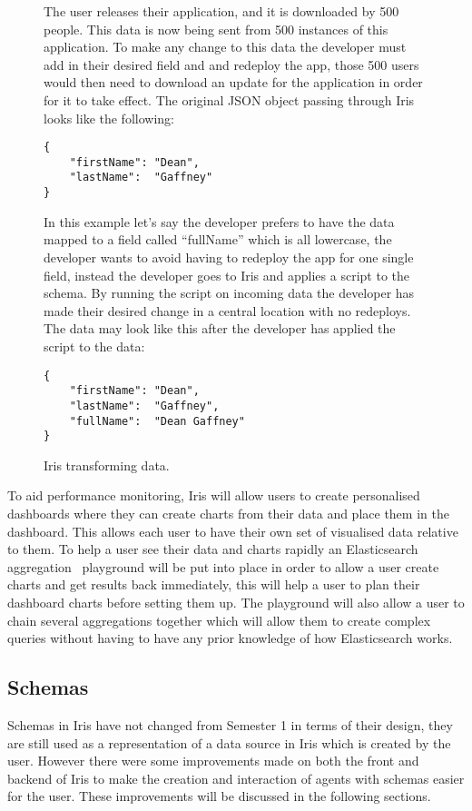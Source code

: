 \documentclass[12pt,a4paper,titlepage]{report}
\newcommand{\q}[1]{``#1''}
\begin{document}
\begin{figure}[H]
\begin{tcolorbox}

The user releases their application, and it is downloaded by 500 people. This data is now being sent from 500 instances of this application. To make any change to this data the developer must add in their desired field and and redeploy the app, those 500 users would then need to download an update for the application in order for it to take effect. The original JSON object passing through Iris looks like the following:
\begin{verbatim}
{
	"firstName": "Dean",
	"lastName":  "Gaffney"
}
\end{verbatim}

In this example let's say the developer prefers to have the data mapped to a field called \q{fullName} which is all lowercase, the developer wants to avoid having to redeploy the app for one single field, instead the developer goes to Iris and applies a script to the schema. By running the script on incoming data the developer has made their desired change in a central location with no redeploys. The data may look like this after the developer has applied the script to the data:
\begin{verbatim}
{
	"firstName": "Dean",
	"lastName":  "Gaffney",
	"fullName":  "Dean Gaffney"
}
\end{verbatim}
\end{tcolorbox}
\caption{Iris transforming data.}
\end{figure}

To aid performance monitoring, Iris will allow users to create personalised dashboards where they can create charts from their data and place them in the dashboard. This allows each user to have their own set of visualised data relative to them. To help a user see their data and charts rapidly an Elasticsearch aggregation~\parencite{Elastic.co.Aggregations} playground will be put into place in order to allow a user create charts and get results back immediately, this will help a user to plan their dashboard charts before setting them up. The playground will also allow a user to chain several aggregations together which will allow them to create complex queries without having to have any prior knowledge of how Elasticsearch works.

 
\subsection{Schemas}
Schemas in Iris have not changed from Semester 1 in terms of their design, they are still used as a representation of a data source in Iris which is created by the user. However there were some improvements made on both the front and backend of Iris to make the creation and interaction of agents with schemas easier for the user. These improvements will be discussed in the following sections.
\end{document}
